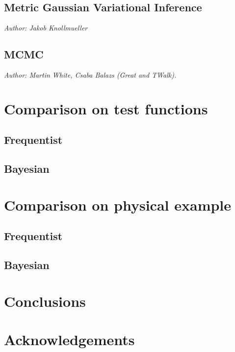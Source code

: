 \documentclass[12pt]{JHEP3}
\begin{document}
\subsection{Metric Gaussian Variational Inference}
\emph{Author: Jakob Knollmueller}

\subsection{MCMC}

\emph{Author: Martin White, Csaba Balazs (Great and TWalk).} 

\section{Comparison on test functions}
\subsection{Frequentist}
\subsection{Bayesian}


\section{Comparison on physical example}

\subsection{Frequentist}
\subsection{Bayesian}

\section{Conclusions}\label{Conclusions}

\section{Acknowledgements}


\end{document}
